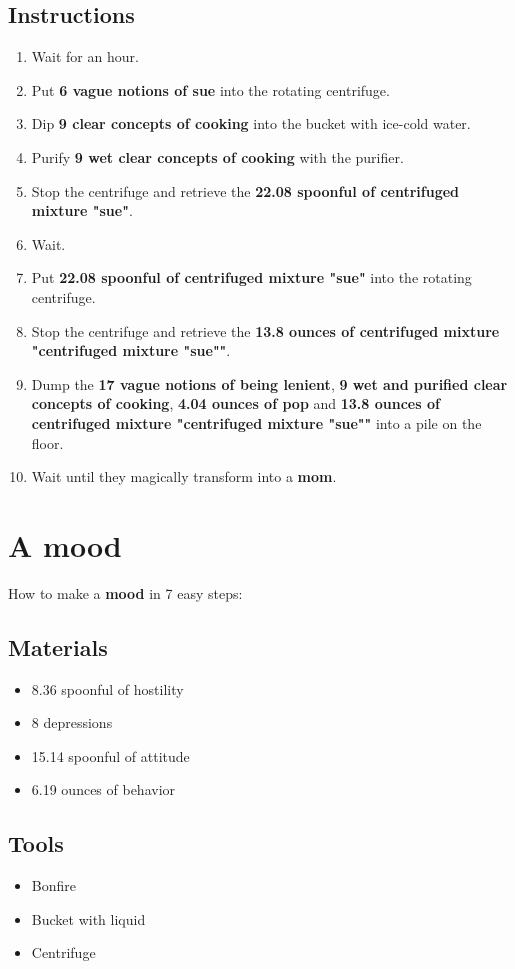 \documentclass{article}
\begin{document}
\subsection{Instructions}\begin{enumerate}
\item 
Wait for an hour.
\item 
Put \textbf{6 vague notions of sue} into the rotating centrifuge.
\item 
Dip \textbf{9 clear concepts of cooking} into the bucket with ice-cold water.
\item 
Purify \textbf{9 wet clear concepts of cooking} with the purifier.
\item 
Stop the centrifuge and retrieve the \textbf{22.08 spoonful of centrifuged mixture "sue"}.
\item 
Wait.
\item 
Put \textbf{22.08 spoonful of centrifuged mixture "sue"} into the rotating centrifuge.
\item 
Stop the centrifuge and retrieve the \textbf{13.8 ounces of centrifuged mixture "centrifuged mixture "sue""}.
\item 
Dump the \textbf{17 vague notions of being lenient}, \textbf{9 wet and purified clear concepts of cooking}, \textbf{4.04 ounces of pop} and \textbf{13.8 ounces of centrifuged mixture "centrifuged mixture "sue""} into a pile on the floor.
\item 
Wait until they magically transform into a \textbf{mom}.
\end{enumerate}
\newpage
\section{A mood}How to make a \textbf{mood} in 7 easy steps:

\subsection{Materials}\begin{itemize}
\item 
8.36 spoonful of hostility
\item 
8 depressions
\item 
15.14 spoonful of attitude
\item 
6.19 ounces of behavior
\end{itemize}
\subsection{Tools}\begin{itemize}
\item 
Bonfire
\item 
Bucket with liquid
\item 
Centrifuge
\end{itemize}
\end{document}
